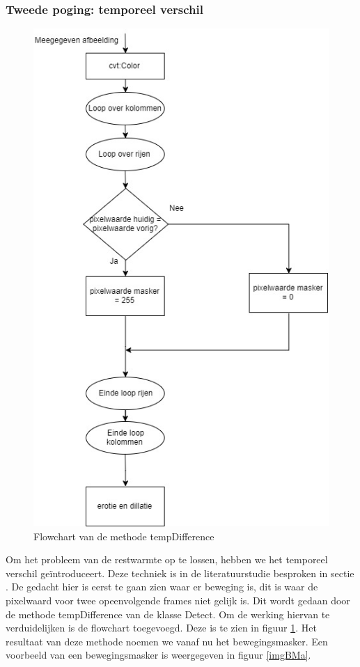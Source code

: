 \subsubsection{Tweede poging: temporeel verschil}
\begin{figure}[hbp]
	\includegraphics[scale=0.6]{FlowChart_TempDifference}
	\caption{Flowchart van de methode tempDifference}
	\label{imgFCTDi}
\end{figure}
Om het probleem van de restwarmte op te lossen, hebben we het temporeel verschil ge\"introduceert. Deze techniek is in de literatuurstudie besproken in sectie \label{refBET}. De gedacht hier is eerst te gaan zien waar er beweging is, dit is waar de pixelwaard voor twee opeenvolgende frames niet gelijk is. Dit wordt gedaan door de methode tempDifference van de klasse Detect. Om de werking hiervan te verduidelijken is de flowchart toegevoegd.  Deze is te zien in figuur \ref{imgFCTDi}. Het resultaat van deze methode noemen we vanaf nu het bewegingsmasker. Een voorbeeld van een bewegingsmasker is weergegeven in figuur \ref{imgBMa}.
